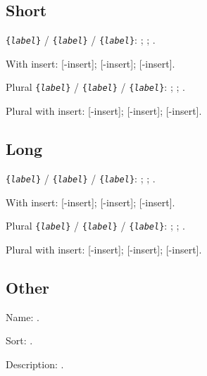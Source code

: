\documentclass{report}
\newcommand{\stylelist}{}
\newcommand{\marg}[1]{\{\textnormal{\emph{#1}}\}}
\begin{document}
{\subsection{Short}
\texttt{\string\glsxtrshort\marg{label}} /
\texttt{\string\Glsxtrshort\marg{label}} /
\texttt{\string\GLSxtrshort\marg{label}}: 
;
;
.\par\noindent
With insert: 
[-insert];
[-insert];
[-insert].\par\noindent
Plural \texttt{\string\glsxtrshortpl\marg{label}} /
\texttt{\string\Glsxtrshortpl\marg{label}} /
\texttt{\string\GLSxtrshortpl\marg{label}}: 
;
;
.\par\noindent
Plural with insert: 
[-insert];
[-insert];
[-insert].
\subsection{Long}
\texttt{\string\glsxtrlong\marg{label}} /
\texttt{\string\Glsxtrlong\marg{label}} /
\texttt{\string\GLSxtrlong\marg{label}}: 
;
;
.\par\noindent
With insert: 
[-insert];
[-insert];
[-insert].\par\noindent
Plural \texttt{\string\glsxtrlongpl\marg{label}} /
\texttt{\string\Glsxtrlongpl\marg{label}} /
\texttt{\string\GLSxtrlongpl\marg{label}}: 
;
;
.\par\noindent
Plural with insert: 
[-insert];
[-insert];
[-insert].
\subsection{Other}
Name: .\par\noindent
Sort: \texttt{}.\par\noindent
Description: .\par
}

\dolistloop{\stylelist}
\printglossaries
\end{document}
